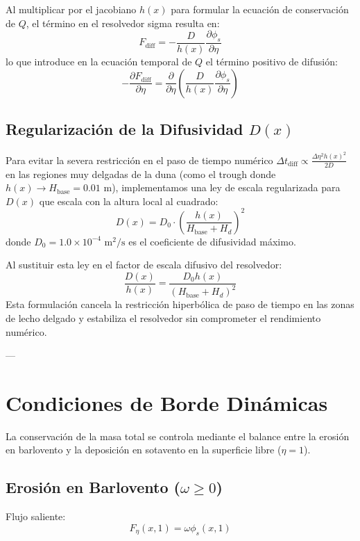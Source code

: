 \documentclass[11pt,a4paper]{article}
\begin{document}
Al multiplicar por el jacobiano $h(x)$ para formular la ecuación de conservación de $Q$, el término en el resolvedor sigma resulta en:
\begin{equation}
F_{\text{diff}} = - \frac{D}{h(x)} \frac{\partial \phi_s}{\partial \eta}
\end{equation}
lo que introduce en la ecuación temporal de $Q$ el término positivo de difusión:
\begin{equation}
-\frac{\partial F_{\text{diff}}}{\partial \eta} = \frac{\partial}{\partial \eta} \left( \frac{D}{h(x)} \frac{\partial \phi_s}{\partial \eta} \right)
\end{equation}

\subsection{Regularización de la Difusividad $D(x)$}
Para evitar la severa restricción en el paso de tiempo numérico $\Delta t_{\text{diff}} \propto \frac{\Delta \eta^2 h(x)^2}{2 D}$ en las regiones muy delgadas de la duna (como el trough donde $h(x) \to H_{\text{base}} = 0.01$ m), implementamos una ley de escala regularizada para $D(x)$ que escala con la altura local al cuadrado:
\begin{equation}
D(x) = D_0 \cdot \left( \frac{h(x)}{H_{\text{base}} + H_d} \right)^2
\end{equation}
donde $D_0 = 1.0 \times 10^{-4} \text{ m}^2\text{/s}$ es el coeficiente de difusividad máximo.

Al sustituir esta ley en el factor de escala difusivo del resolvedor:
\begin{equation}
\frac{D(x)}{h(x)} = \frac{D_0 h(x)}{(H_{\text{base}} + H_d)^2}
\end{equation}
Esta formulación cancela la restricción hiperbólica de paso de tiempo en las zonas de lecho delgado y estabiliza el resolvedor sin comprometer el rendimiento numérico.

---

\section{Condiciones de Borde Dinámicas}
La conservación de la masa total se controla mediante el balance entre la erosión en barlovento y la deposición en sotavento en la superficie libre ($\eta = 1$).

\subsection{Erosión en Barlovento (\(\omega \ge 0\))}
Flujo saliente:
\begin{equation}
F_{\eta}(x, 1) = \omega \phi_s(x, 1)
\end{equation}
\end{document}
